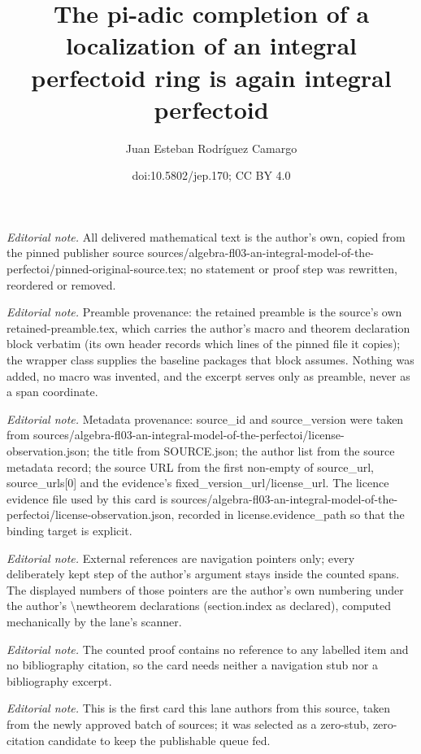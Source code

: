 \documentclass[10pt,a4paper]{amsart}
\title{The pi-adic completion of a localization of an integral perfectoid ring is again integral perfectoid}
\author{Juan Esteban Rodríguez Camargo}
\date{doi:10.5802/jep.170; CC BY 4.0}
\numberwithin{equation}{section}
\theoremstyle{definition}
\begin{document}
\maketitle
\noindent\textit{Editorial note.} All delivered mathematical text is the author's own, copied from the pinned publisher source sources/algebra-fl03-an-integral-model-of-the-perfectoi/pinned-original-source.tex; no statement or proof step was rewritten, reordered or removed.\par\medskip
\noindent\textit{Editorial note.} Preamble provenance: the retained preamble is the source's own retained-preamble.tex, which carries the author's macro and theorem declaration block verbatim (its own header records which lines of the pinned file it copies); the wrapper class supplies the baseline packages that block assumes. Nothing was added, no macro was invented, and the excerpt serves only as preamble, never as a span coordinate.\par\medskip
\noindent\textit{Editorial note.} Metadata provenance: source\_id and source\_version were taken from sources/algebra-fl03-an-integral-model-of-the-perfectoi/license-observation.json; the title from SOURCE.json; the author list from the source metadata record; the source URL from the first non-empty of source\_url, source\_urls[0] and the evidence's fixed\_version\_url/license\_url. The licence evidence file used by this card is sources/algebra-fl03-an-integral-model-of-the-perfectoi/license-observation.json, recorded in license.evidence\_path so that the binding target is explicit.\par\medskip
\noindent\textit{Editorial note.} External references are navigation pointers only; every deliberately kept step of the author's argument stays inside the counted spans. The displayed numbers of those pointers are the author's own numbering under the author's \textbackslash{}newtheorem declarations (section.index as declared), computed mechanically by the lane's scanner.\par\medskip
\noindent\textit{Editorial note.} The counted proof contains no reference to any labelled item and no bibliography citation, so the card needs neither a navigation stub nor a bibliography excerpt.\par\medskip
\noindent\textit{Editorial note.} This is the first card this lane authors from this source, taken from the newly approved batch of sources; it was selected as a zero-stub, zero-citation candidate to keep the publishable queue fed.\par\medskip
\end{document}
